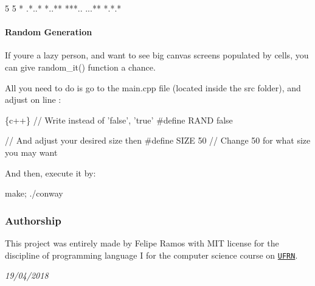 \begin{DoxyCode}
5 5
*
.*..*
*..**
***..
...**
*.*.*
\end{DoxyCode}


\paragraph*{Random Generation}

If you\textquotesingle{}re a lazy person, and want to see big canvas screens populated by cells, you can give {\ttfamily random\+\_\+it()} function a chance.

All you need to do is go to the {\ttfamily main.\+cpp} file (located inside the {\ttfamily src} folder), and adjust on line {}\+:


\begin{DoxyCode}
\{c++\}
// Write instead of 'false', 'true'
#define RAND false

// And adjust your desired size then
#define SIZE 50 // Change 50 for what size you may want
\end{DoxyCode}


And then, execute it by\+:


\begin{DoxyCode}
make; ./conway
\end{DoxyCode}


\subsubsection*{Authorship}

This project was entirely made by Felipe Ramos with M\+IT license for the discipline of programming language I for the computer science course on \href{http://ufrn.br}{\tt U\+F\+RN}.

{\itshape 19/04/2018} 